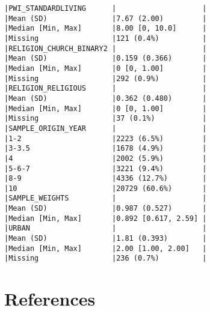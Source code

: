 \documentclass[
  singlecolumn]{report}
\begin{document}
\begin{verbatim}
|PWI_STANDARDLIVING      |                    |
|Mean (SD)               |7.67 (2.00)         |
|Median [Min, Max]       |8.00 [0, 10.0]      |
|Missing                 |121 (0.4%)          |
|RELIGION_CHURCH_BINARY2 |                    |
|Mean (SD)               |0.159 (0.366)       |
|Median [Min, Max]       |0 [0, 1.00]         |
|Missing                 |292 (0.9%)          |
|RELIGION_RELIGIOUS      |                    |
|Mean (SD)               |0.362 (0.480)       |
|Median [Min, Max]       |0 [0, 1.00]         |
|Missing                 |37 (0.1%)           |
|SAMPLE_ORIGIN_YEAR      |                    |
|1-2                     |2223 (6.5%)         |
|3-3.5                   |1678 (4.9%)         |
|4                       |2002 (5.9%)         |
|5-6-7                   |3221 (9.4%)         |
|8-9                     |4336 (12.7%)        |
|10                      |20729 (60.6%)       |
|SAMPLE_WEIGHTS          |                    |
|Mean (SD)               |0.987 (0.527)       |
|Median [Min, Max]       |0.892 [0.617, 2.59] |
|URBAN                   |                    |
|Mean (SD)               |1.81 (0.393)        |
|Median [Min, Max]       |2.00 [1.00, 2.00]   |
|Missing                 |236 (0.7%)          |
\end{verbatim}

\newpage{}

\hypertarget{references}{%
\section*{References}\label{references}}
\end{document}
